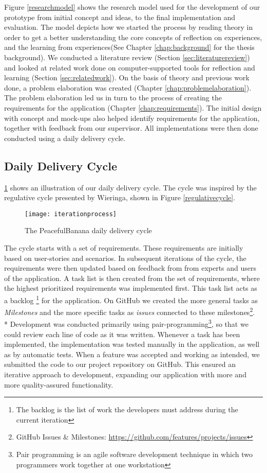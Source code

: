 Figure \ref{researchmodel} shows the research model used for the development of our prototype from initial concept and ideas, to the final implementation and evaluation. The model depicts how we started the process by reading theory in order to get a better understanding the core concepts of reflection on experiences, and the learning from experiences(See Chapter \ref{chap:background} for the thesis background). We conducted a literature review (Section \ref{sec:literaturereview}) and looked at related work done on computer-supported tools for reflection and learning (Section \ref{sec:relatedwork}). On the basis of theory and previous work done, a problem elaboration was created (Chapter \ref{chap:problemelaboration}). The problem elaboration led us in turn to the process of creating the requirements for the application (Chapter \ref{chap:requirements}). The initial design with concept and mock-ups also helped identify requirements for the application, together with feedback from our supervisor. All implementations were then done conducted using a daily delivery cycle.
\clearpage

\subsection{Daily Delivery Cycle}
\label{sec:dailydeliverycycle}

 \ref{iterationprocess} shows an illustration of our daily delivery cycle. The cycle was inspired by the regulative cycle presented by Wieringa\citep{wieringa}, shown in Figure \ref{regulativecycle}. 
\begin{figure}[!htpb]
\centering
	\texttt{[image: iterationprocess]}
\caption{The PeacefulBanana daily delivery cycle}
\label{iterationprocess}
\end{figure}

The cycle starts with a set of requirements. These requirements are initially based on user-stories and scenarios. In subsequent iterations of the cycle, the requirements were then updated based on feedback from from experts and users of the application. A task list is then created from the set of requirements, where the highest prioritized requirements was implemented first. This task list acts as a backlog 
\footnote{The backlog is the list of work the developers must address during the current iteration} for the application. On GitHub we created the more general tasks as \emph{Milestones} and the more specific tasks as \emph{issues} connected to these milestones\footnote{GitHub Issues \& Milestones: \url{https://github.com/features/projects/issues}}.\\* Development was conducted primarily using pair-programming\footnote{Pair programming is an agile software development technique in which two programmers work together at one workstation}, so that we could review each line of code as it was written. Whenever a task has been implemented, the implementation was tested manually in the application, as well as by automatic tests. When a feature was accepted and working as intended, we submitted the code to our project repository on GitHub.
This ensured an iterative approach to development, expanding our application with more and more quality-assured functionality. 

